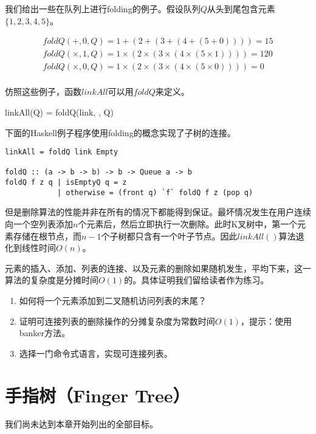 \documentclass[UTF8]{article}
\begin{document}
我们给出一些在队列上进行folding的例子。假设队列$Q$从头到尾包含元素$\{ 1, 2, 3, 4, 5 \}$。

\[
\begin{array}{l}
foldQ(+, 0, Q) = 1 + (2 + (3 + (4 + (5 + 0)))) = 15 \\
foldQ(\times, 1, Q) = 1 \times (2 \times (3 \times (4 \times (5 \times 1)))) = 120 \\
foldQ(\times, 0, Q) = 1 \times (2 \times (3 \times (4 \times (5 \times 0)))) = 0 \\
\end{array}
\]

仿照这些例子，函数$linkAll$可以用$foldQ$来定义。

\be
linkAll(Q) = foldQ(link, \phi, Q)
\ee

下面的Haskell例子程序使用folding的概念实现了子树的连接。

\begin{lstlisting}
linkAll = foldQ link Empty

foldQ :: (a -> b -> b) -> b -> Queue a -> b
foldQ f z q | isEmptyQ q = z
            | otherwise = (front q) `f` foldQ f z (pop q)
\end{lstlisting}

但是删除算法的性能并非在所有的情况下都能得到保证。最坏情况发生在用户连续向一个空列表添加$n$个元素后，然后立即执行一次删除。此时K叉树中，第一个元素存储在根节点，而$n-1$个子树都只含有一个叶子节点。因此$linkAll()$算法退化到线性时间$O(n)$。

元素的插入、添加、列表的连接、以及元素的删除如果随机发生，平均下来，这一算法的复杂度是分摊时间$O(1)$的。具体证明我们留给读者作为练习。

\begin{Exercise}
\begin{enumerate}
\item 如何将一个元素添加到二叉随机访问列表的末尾？

\item 证明可连接列表的删除操作的分摊复杂度为常数时间$O(1)$，提示：使用banker方法。

\item 选择一门命令式语言，实现可连接列表。
\end{enumerate}
\end{Exercise}

\section{手指树（Finger Tree）}
我们尚未达到本章开始列出的全部目标。
\end{document}
